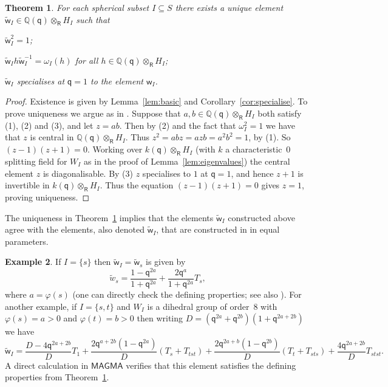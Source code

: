 \documentclass[11pt]{article}
\theoremstyle{plain}
\newtheorem{thm}{Theorem}[section]
\theoremstyle{definition}
\newtheorem{example}[thm]{Example}
\numberwithin{equation}{section}
\def\tw{\widetilde{\mathsf{w}}_I}
\def\QQ{\mathbb{Q}}
\def\sR{\mathsf{R}}
\newcommand{\sw}{\mathsf{w}}
\newcommand{\sq}{\mathsf{q}}
\begin{document}
\begin{thm}\label{thm:unique}
For each spherical subset $I\subseteq S$ there exists a unique element $\tw\in\QQ(\sq)\otimes_{\sR}H_I$ such that 
\begin{compactenum}[$(1)$]
\item $\tw^2=1$;
\item $\tw h\tw^{-1}=\omega_I(h)$ for all $h\in\QQ(\sq)\otimes_{\sR}H_I$;
\item $\tw$ specialises at $\sq=1$ to the element $\sw_I$. 
\end{compactenum}
\end{thm}

\begin{proof}
Existence is given by Lemma~\ref{lem:basic} and Corollary~\ref{cor:specialise}. To prove uniqueness we argue as in \cite[Proposition~3.2]{RW:24}. Suppose that $a,b\in\QQ(\sq)\otimes_{\sR}H_I$ both satisfy (1), (2) and (3), and let $z=ab$. Then by (2) and the fact that $\omega_I^2=1$ we have that $z$ is central in $\QQ(\sq)\otimes_{\sR}H_I$. Thus $z^2=abz=azb=a^2b^2=1$, by (1). So $(z-1)(z+1)=0$. Working over $k(\sq)\otimes_{\sR}H_I$ (with $k$ a characteristic~$0$ splitting field for $W_I$ as in the proof of Lemma~\ref{lem:eigenvalues}) the central element $z$ is diagonalisable. By (3) $z$ specialises to $1$ at $\sq=1$, and hence $z+1$ is invertible in $k(\sq)\otimes_{\sR}H_I$. Thus the equation $(z-1)(z+1)=0$ gives $z=1$, proving uniqueness. 
\end{proof}

The uniqueness in Theorem~\ref{thm:unique} implies that the elements $\tw$ constructed above agree with the elements, also denoted $\tw$, that are constructed in \cite[Proposition~3.2]{RW:24} in equal parameters. 




\begin{example}
If $I=\{s\}$ then $\tw=\widetilde{\sw}_s$ is given by
$$
\widetilde{w}_s=\frac{1-\sq^{2a}}{1+\sq^{2a}}+\frac{2\sq^{a}}{1+\sq^{2a}}T_s,
$$
where $a=\varphi(s)$ (one can directly check the defining properties; see also \cite[Proposition~3.4]{RW:24}). For another example, if $I=\{s,t\}$ and $W_I$ is a dihedral group of order~$8$ with $\varphi(s)=a>0$ and $\varphi(t)=b>0$ then writing $D=(\sq^{2a}+\sq^{2b})(1+\sq^{2a+2b})$ we have
$$
\tw=\frac{D-4\sq^{2a+2b}}{D}T_1+\frac{2\sq^{a+2b}(1-\sq^{2a})}{D}(T_s+T_{tst})+\frac{2\sq^{2a+b}(1-\sq^{2b})}{D}(T_t+T_{sts})+\frac{4\sq^{2a+2b}}{D}T_{stst}.
$$
A direct calculation in $\mathsf{MAGMA}$ verifies that this element satisfies the defining properties from Theorem~\ref{thm:unique}. 
\end{example}
\end{document}
